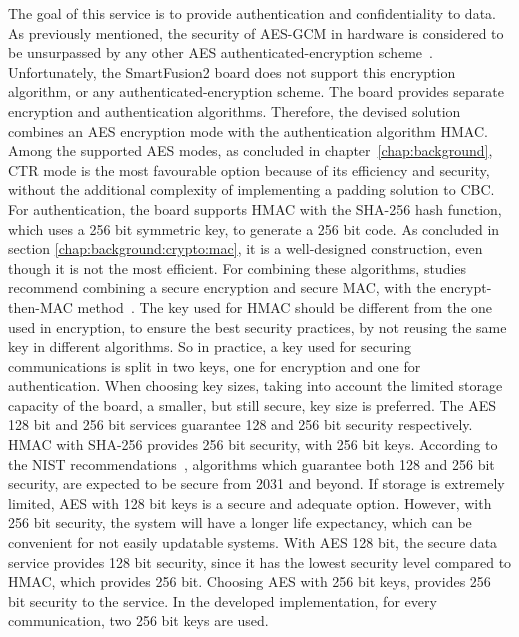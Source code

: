The goal of this service is to provide authentication and confidentiality to data.
As previously mentioned, the security of AES-GCM in hardware is considered to be unsurpassed by any other AES authenticated-encryption scheme~\cite{aesmodes}.
Unfortunately, the SmartFusion2 board does not support this encryption algorithm, or any authenticated-encryption scheme. The board provides separate encryption and authentication algorithms.
Therefore, the devised solution combines an AES encryption mode with the authentication algorithm HMAC. Among the supported AES modes, as concluded in chapter~\ref{chap:background}, CTR mode is the most favourable option because of its efficiency and security, without the additional complexity of implementing a padding solution to CBC.
For authentication, the board supports HMAC with the SHA-256 hash function, which uses a 256 bit symmetric key, to generate a 256 bit code. As concluded in section \ref{chap:background:crypto:mac}, it is a well-designed construction, even though it is not the most efficient.
For combining these algorithms, studies recommend combining a secure encryption and secure MAC, with the encrypt-then-MAC method~\cite{encryptmacorder}.
The key used for HMAC should be different from the one used in encryption, to ensure the best security practices, by not reusing the same key in different algorithms. So in practice, a key used for securing communications is split in two keys, one for encryption and one for authentication.
When choosing key sizes, taking into account the limited storage capacity of the board, a smaller, but still secure, key size is preferred. The AES 128 bit and 256 bit services guarantee 128 and 256 bit security respectively. HMAC with SHA-256 provides 256 bit security, with 256 bit keys. According to the NIST recommendations~\cite{nistRecommendations}, algorithms which guarantee both 128 and 256 bit security, are expected to be secure from 2031 and beyond. If storage is extremely limited, AES with 128 bit keys is a secure and adequate option. However, with 256 bit security, the system will have a longer life expectancy, which can be convenient for not easily updatable systems.
With AES 128 bit, the secure data service provides 128 bit security, since it has the lowest security level compared to HMAC, which provides 256 bit. Choosing AES with 256 bit keys, provides 256 bit security to the service.
In the developed implementation, for every communication, two 256 bit keys are used.

